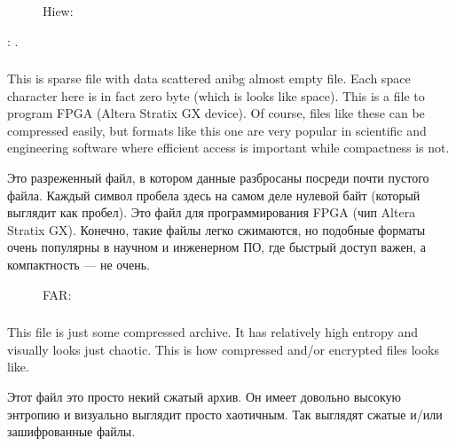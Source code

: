 \begin{figure}[H]
\centering
{}
\caption{Hiew: }
\end{figure}

: 
.

\clearpage
\subsubsection{}

\ifdefined\ENGLISH
This is sparse file with data scattered anibg almost empty file.
Each space character here is in fact zero byte (which is looks like space).
This is a file to program FPGA (Altera Stratix GX device).
Of course, files like these can be compressed easily, but formats like this one are very popular in scientific and engineering software where efficient access is important while compactness is not.
\fi %

\ifdefined\RUSSIAN
Это разреженный файл, в котором данные разбросаны посреди почти пустого файла.
Каждый символ пробела здесь на самом деле нулевой байт (который выглядит как пробел).
Это файл для программирования FPGA (чип Altera Stratix GX).
Конечно, такие файлы легко сжимаются, но подобные форматы очень популярны в научном и инженерном ПО, где быстрый доступ важен, а компактность --- не очень.
\fi %

\begin{figure}[H]
\centering
{}
\caption{FAR: }
\end{figure}

\clearpage
\subsubsection{}

\ifdefined\ENGLISH
This file is just some compressed archive.
It has relatively high entropy and visually looks just chaotic.
This is how compressed and/or encrypted files looks like.
\fi %

\ifdefined\RUSSIAN
Этот файл это просто некий сжатый архив.
Он имеет довольно высокую энтропию и визуально выглядит просто хаотичным.
Так выглядят сжатые и/или зашифрованные файлы.
\fi %

